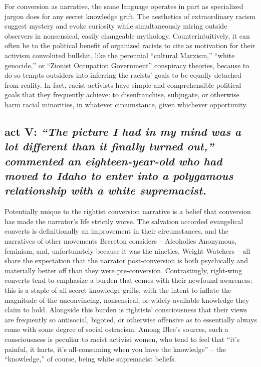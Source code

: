 \documentclass[11pt]{article}
\begin{document}
For conversion as narrative, the same language operates in part as specialized jargon does for any secret knowledge grift. The aesthetics of extraordinary racism suggest mystery and evoke curiosity while simultaneously miring outside observers in nonsensical, easily changeable mythology. Counterintuitively, it can often be to the political benefit of organized racists to cite as motivation for their activism convoluted bullshit, like the perennial ``cultural Marxism,'' ``white genocide,'' or ``Zionist Occupation Government'' conspiracy theories, because to do so tempts outsiders into inferring the racists' goals to be equally detached from reality. In fact, racist activists have simple and comprehensible political goals that they frequently achieve: to disenfranchise, subjugate, or otherwise harm racial minorities, in whatever circumstance, given whichever opportunity.

\subsection*{act V: {\itshape ``The picture I had in my mind was a lot different than it finally turned out,'' commented an eighteen-year-old who had moved to Idaho to enter into a polygamous relationship with a white supremacist.}\autocite[153]{Bl02}}

Potentially unique to the rightist conversion narrative is a belief that conversion has made the narrator's life strictly worse. The salvation accorded evangelical converts is definitionally an improvement in their circumstances, and the narratives of other movements Brereton considers -- Alcoholics Anonymous, feminism, and, unfortunately because it was the nineties, Weight Watchers -- all share the expectation that the narrator post-conversion is both psychically and materially better off than they were pre-conversion. Contrastingly, right-wing converts tend to emphasize a burden that comes with their newfound awareness: this is a staple of all secret knowledge grifts, with the intent to inflate the magnitude of the unconvincing, nonsensical, or widely-available knowledge they claim to hold. Alongside this burden is rightists' consciousness that their views are frequently so antisocial, bigoted, or otherwise offensive as to essentially always come with some degree of social ostracism. Among Blee's sources, such a consciousness is peculiar to racist activist women, who tend to feel that ``it's painful, it hurts, it's all-consuming when you have the knowledge'' -- the ``knowledge,'' of course, being white supremacist beliefs.\autocite[47]{Bl02}
\end{document}
